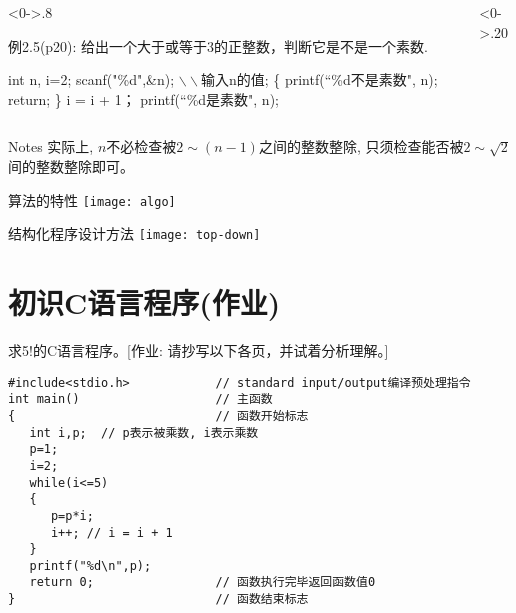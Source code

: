 \begin{frame}%
\begin{columns}%
	\begin{column}<0->{.8\textwidth}
		\begin{algorithm}[H]  
			\caption{例2.5(p20): 给出一个大于或等于3的正整数，判断它是不是一个素数.} %
			\begin{algorithmic}[1] %
				\State int n, i=2;
				\State scanf("\%d",\&n); $\backslash\backslash$输入n的值; 
				 \{ printf(``\%d不是素数", n); return; \}
				\EndIf
				\State i = i + 1；
				\EndWhile
				\State printf(``\%d是素数", n);	
			\end{algorithmic}  
		\end{algorithm}
	\end{column}%
	\begin{column}<0->{.20\textwidth}
		\newline
		\newline
	\end{column}%
\end{columns}
\begin{block}{Notes}
	实际上, $n$不必检查被$2\sim(n-1)$之间的整数整除, 只须检查能否被$2\sim\sqrt{2}$间的整数整除即可。
\end{block}
\end{frame}

\begin{frame}{算法的特性}
\texttt{[image: algo]}
\end{frame}

\begin{frame}{结构化程序设计方法}
\texttt{[image: top-down]}
\end{frame}

\section{初识C语言程序(作业)}

\begin{frame}[fragile]{求5!的C语言程序。\small{[作业: 请抄写以下各页，并试着分析理解。]}}
\begin{lstlisting}
#include<stdio.h>            // standard input/output编译预处理指令
int main()                   // 主函数
{                            // 函数开始标志
   int i,p;  // p表示被乘数, i表示乘数
   p=1;
   i=2;
   while(i<=5)
   {  
      p=p*i;
      i++; // i = i + 1
   }
   printf("%d\n",p);
   return 0;                 // 函数执行完毕返回函数值0
}                            // 函数结束标志
\end{lstlisting}
\end{frame}

